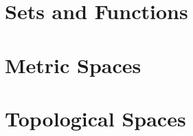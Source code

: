 \documentclass[11 pt]{book}
\begin{document}
\thispagestyle{empty}

\renewcommand{\MakeUppercase}[1]{#1}

\tableofcontents



\mainmatter


\part{Sets and Functions}


\part{Metric Spaces}


\part{Topological Spaces}





\backmatter


\printindex
%
\end{document}
